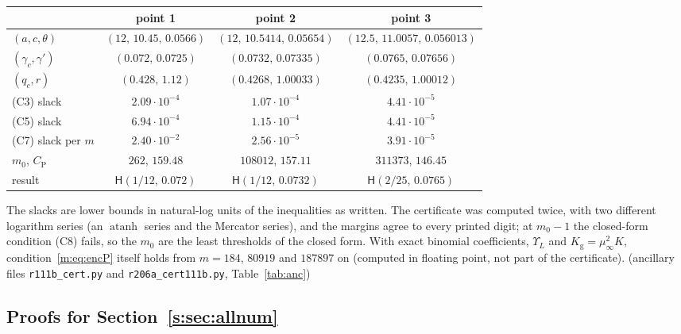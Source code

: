 \documentclass[11pt]{article}
\theoremstyle{definition}
\theoremstyle{remark}
\newcommand{\Kg}{K_{\mathrm g}}
\newcommand{\Hyp}{\mathsf{H}}
\newcommand{\HypPrunedEps}{2/25}%
\newcommand{\HypPrunedGamma}{0.0765}%
\newcommand{\HypPzeroGamma}{0.072}%
\newcommand{\HypPoneGamma}{0.0732}%
\begin{document}
\begin{center}\small
\renewcommand{\arraystretch}{1.1}\setlength{\tabcolsep}{4pt}
\begin{tabular}{@{}lccc@{}}
 & point 1 & point 2 & point 3\\\hline
$(a,c,\theta)$ & $(12,\,10.45,\,0.0566)$ & $(12,\,10.5414,\,0.05654)$ & $(12.5,\,11.0057,\,0.056013)$\\
$(\gamma_c,\gamma')$ & $(\HypPzeroGamma,\,0.0725)$ & $(\HypPoneGamma,\,0.07335)$ & $(\HypPrunedGamma,\,0.07656)$\\
$(q_c,r)$ & $(0.428,\,1.12)$ & $(0.4268,\,1.00033)$ & $(0.4235,\,1.00012)$\\
(C3) slack & $2.09\cdot10^{-4}$ & $1.07\cdot10^{-4}$ & $4.41\cdot10^{-5}$\\
(C5) slack & $6.94\cdot10^{-4}$ & $1.15\cdot10^{-4}$ & $4.41\cdot10^{-5}$\\
(C7) slack per $m$ & $2.40\cdot10^{-2}$ & $2.56\cdot10^{-5}$ & $3.91\cdot10^{-5}$\\
$m_0$, $C_{\mathrm P}$ & $262$, $159.48$ & $108012$, $157.11$ & $311373$, $146.45$\\
result & $\Hyp(1/12,\,\HypPzeroGamma)$ & $\Hyp(1/12,\,\HypPoneGamma)$ & $\Hyp(\HypPrunedEps,\,\HypPrunedGamma)$
\end{tabular}
\end{center}
The slacks are lower bounds in natural-log units of the inequalities as written. The certificate was computed twice, with two different logarithm series (an $\operatorname{atanh}$ series and the Mercator series), and the margins agree to every printed digit; at $m_0-1$ the closed-form condition (C8) fails, so the $m_0$ are the least thresholds of the closed form. With exact binomial coefficients, $\Upsilon_L$ and $\Kg=\mu_\infty^2K$, condition~\eqref{m:eq:encP} itself holds from $m=184$, $80919$ and $187897$ on (computed in floating point, not part of the certificate).
 (ancillary files \texttt{r111b\_cert.py} and \texttt{r206a\_cert111b.py}, Table~\ref{tab:anc})

\subsection{Proofs for Section~\ref{s:sec:allnum}}\label{b:sec:allnum}
\end{document}
